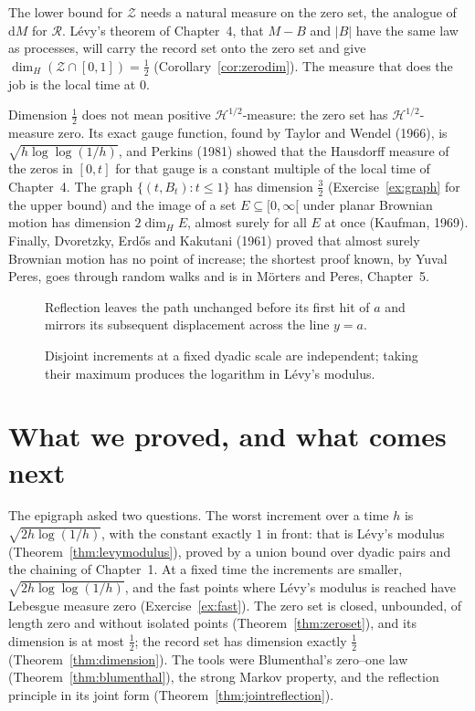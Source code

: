 The lower bound for $\mathcal Z$ needs a natural measure on the zero set, the analogue of $\mathrm dM$ for $\mathcal R$. L\'evy's theorem of Chapter~4, that $M-B$ and $|B|$ have the same law as processes, will
carry the record set onto the zero set and give $\dim_H(\mathcal Z\cap[0,1])=\frac12$ (Corollary~\ref{cor:zerodim}). The measure that does the job is the local time at $0$.

\begin{remark}
Dimension $\frac12$ does not mean positive $\mathcal H^{1/2}$-measure: the zero set has $\mathcal H^{1/2}$-measure zero. Its exact gauge function, found by Taylor and Wendel (1966), is
$\sqrt{h\log\log(1/h)}$, and Perkins (1981) showed that the Hausdorff measure of the zeros in $[0,t]$ for that gauge is a constant multiple of the local time of Chapter~4. The graph $\{(t,B_t):t\le1\}$ has dimension $\frac32$ (Exercise~\ref{ex:graph} for the upper bound) and the image of a set $E\subseteq[0,\infty[$ under planar Brownian motion has
dimension $2\dim_HE$, almost surely for all $E$ at once (Kaufman, 1969). Finally, Dvoretzky, Erd\H{o}s and Kakutani (1961) proved that almost surely Brownian motion has no point of increase; the shortest proof
known, by Yuval Peres, goes through random walks and is in M\"orters and Peres, Chapter~5.
\end{remark}

\begin{figure}[ht]
\centering
{}
\caption{Reflection leaves the path unchanged before its first hit of $a$ and mirrors its subsequent displacement across the line $y=a$.}
\label{fig:v12reflection}
\end{figure}

\begin{figure}[ht]
\centering
{}
\caption{Disjoint increments at a fixed dyadic scale are independent; taking their maximum produces the logarithm in Lévy's modulus.}
\label{fig:v12dyadic}
\end{figure}

\section{What we proved, and what comes next}

The epigraph asked two questions. The worst increment over a time $h$ is $\sqrt{2h\log(1/h)}$, with the constant exactly $1$ in front: that is L\'evy's
modulus (Theorem~\ref{thm:levymodulus}), proved by a union bound over dyadic pairs and the chaining of Chapter~1. At a fixed time the increments are
smaller, $\sqrt{2h\log\log(1/h)}$, and the fast points where L\'evy's modulus is reached have Lebesgue measure zero (Exercise~\ref{ex:fast}). The zero set
is closed, unbounded, of length zero and without isolated points (Theorem~\ref{thm:zeroset}), and its dimension is at most $\frac12$; the record set has
dimension exactly $\frac12$ (Theorem~\ref{thm:dimension}). The tools were Blumenthal's zero--one law (Theorem~\ref{thm:blumenthal}), the strong Markov
property, and the reflection principle in its joint form (Theorem~\ref{thm:jointreflection}).

